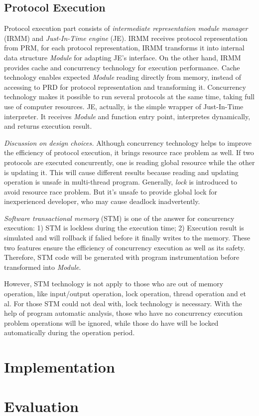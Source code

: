 \documentclass[sigplan,screen]{acmart}
\begin{document}
\subsection{Protocol Execution}
Protocol execution part consists of \textit{intermediate representation module
  manager} (IRMM) and \textit{Just-In-Time engine} (JE). IRMM receives protocol
representation from PRM, for each protocol representation, IRMM transforms it
into internal data structure \textit{Module} for adapting JE's interface.
On the other hand,
IRMM provides cache and concurrency technology for execution performance.
Cache technology enables expected \textit{Module} reading directly from memory,
instead of accessing to PRD for protocol representation and transforming it.
Concurrency technology makes it possible to run several protocols at the same
time, taking full use of computer resources.
JE, actually, is the simple wrapper of Just-In-Time interpreter. It receives
\textit{Module} and function entry point, interpretes dynamically, and returns
execution result.

\textit{Discussion on design choices.} Although concurrency technology helps to
improve the efficiency of protocol execution, it brings resource race problem
as well. If two protocols are executed concurrently, one is reading global
resource while the other is updating it. This will cause different results
because reading and updating operation is unsafe in multi-thread program.
Generally, \textit{lock} is introduced to avoid resource race problem. But it's
unsafe to provide global lock for inexperienced developer, who may cause
deadlock inadvertently.

\textit{Software transactional memory} (STM) is one of the answer for concurrency
execution: 1) STM is lockless during the execution time; 2) Execution result is
simulated and will rollback if falied before it finally writes to the memory.
These two
features ensure the efficiency of concurrency execution as well as its safety.
Therefore, STM code will be generated with program instrumentation before
transformed into \textit{Module}.

However, STM technology is not apply to those who are out of memory operation,
like input/output operation, lock operation, thread operation and et al.
For those STM could not deal with, lock technology is necessary.
With the help of program automatic analysis, those who have no concurrency
execution problem operations will be ignored, while those do have will be
locked automatically during the operation period.

\section{Implementation}
\section{Evaluation}


\end{document}

